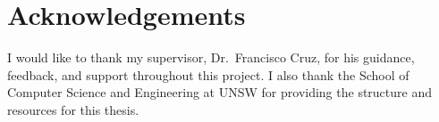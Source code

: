 \chapter*{Acknowledgements}\label{ack}

I would like to thank my supervisor, Dr.\ Francisco Cruz, for his guidance, feedback, and support throughout this project. I also thank the School of Computer Science and Engineering at UNSW for providing the structure and resources for this thesis.
